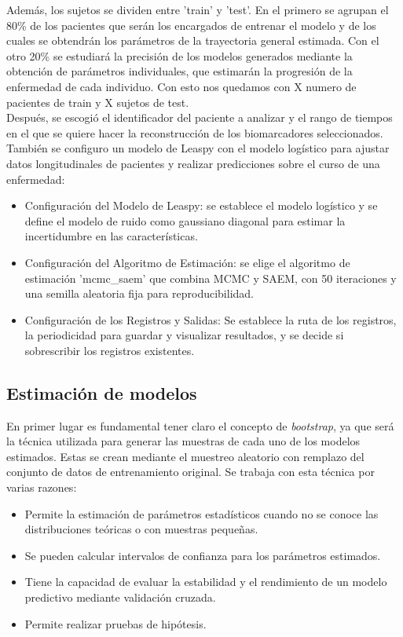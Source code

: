 Además, los sujetos se dividen entre 'train' y 'test'. En el primero se agrupan el 80\% de los pacientes que serán los encargados de entrenar el modelo y de los cuales se obtendrán los parámetros de la trayectoria general estimada. Con el otro 20\% se estudiará la precisión de los modelos generados mediante la obtención de parámetros individuales, que estimarán la progresión de la enfermedad de cada individuo. Con esto nos quedamos con X numero de pacientes de train y X sujetos de test.\\

Después, se escogió el identificador del paciente a analizar y el rango de tiempos en el que se quiere hacer la reconstrucción de los biomarcadores seleccionados. También se configuro un modelo de Leaspy con el modelo logístico para ajustar datos longitudinales de pacientes y realizar predicciones sobre el curso de una enfermedad:
\begin{itemize}
	\item Configuración del Modelo de Leaspy: se establece el modelo logístico y se define el modelo de ruido como gaussiano diagonal para estimar la incertidumbre en las características.
	\item Configuración del Algoritmo de Estimación: se elige el algoritmo de estimación 'mcmc\_saem' que combina MCMC y SAEM, con 50 iteraciones y una semilla aleatoria fija para reproducibilidad.
	\item Configuración de los Registros y Salidas: Se establece la ruta de los registros, la periodicidad para guardar y visualizar resultados, y se decide si sobrescribir los registros existentes.
\end{itemize}

\subsection{Estimación de modelos}
En primer lugar es fundamental tener claro el concepto de \textit{bootstrap}, ya que será la técnica utilizada para generar las muestras de cada uno de los modelos estimados. Estas se crean mediante el muestreo aleatorio con remplazo del conjunto de datos de entrenamiento original. Se trabaja con esta técnica por varias razones:
\begin{itemize}
	\item Permite la estimación de parámetros estadísticos cuando no se conoce las distribuciones teóricas o con muestras pequeñas.
	\item Se pueden calcular intervalos de confianza para los parámetros estimados.
	\item Tiene la capacidad de evaluar la estabilidad y el rendimiento de un modelo predictivo mediante validación cruzada.
	\item Permite realizar pruebas de hipótesis.
\end{itemize}

